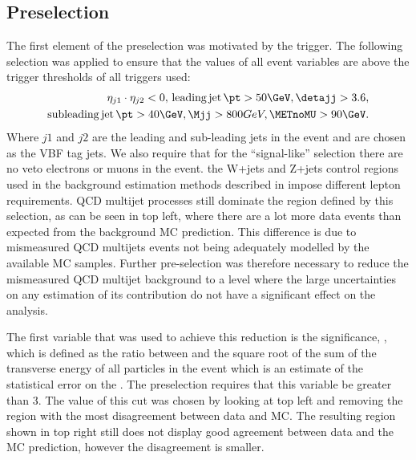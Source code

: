\subsection{Preselection}
\label{sec:parkedpresel}
The first element of the preselection was motivated by the trigger. The following selection was applied to ensure that the values of all event variables are above the trigger thresholds of all triggers used:
\begin{align}
  \label{eq:parkedprepresel}
  \begin{split}
  \eta_{j1}\cdot\eta_{j2}<0,\,\mathrm{leading\,jet\,}\pt>50 \GeV, \detajj>3.6, \\
  \mathrm{subleading\,jet\,}\pt>40 \GeV, \Mjj>800 GeV, \METnoMU>90\GeV.
  \end{split}
\end{align}
Where $j1$ and $j2$ are the leading and sub-leading \pt jets in the event and are chosen as the \ac{VBF} tag jets. We also require that for the ``signal-like'' selection there are no veto electrons or muons in the event. the W+jets and Z+jets control regions used in the background estimation methods described in  impose different lepton requirements. QCD multijet processes still dominate the region defined by this selection, as can be seen in  top left, where there are a lot more data events than expected from the background \ac{MC} prediction. This difference is due to mismeasured \ac{QCD} multijets events not being adequately modelled by the available \ac{MC} samples. Further pre-selection was therefore necessary to reduce the mismeasured \ac{QCD} multijet background to a level where the large uncertainties on any estimation of its contribution do not have a significant effect on the analysis.

The first variable that was used to achieve this reduction is the \MET significance, \METsig, which is defined as the ratio between \METnoMU and the square root of the sum of the transverse energy of all particles in the event which is an estimate of the statistical error on the \MET. The preselection requires that this variable be greater than 3. The value of this cut was chosen by looking at  top left and removing the region with the most disagreement between data and \ac{MC}. The resulting region shown in  top right still does not display good agreement between data and the \ac{MC} prediction, however the disagreement is smaller.

